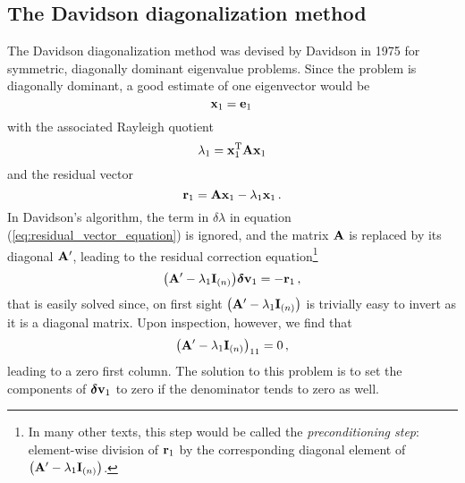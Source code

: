    \subsection{The Davidson diagonalization method}
        The Davidson diagonalization method was devised by Davidson in 1975 \cite{davidson1975} for symmetric, diagonally dominant eigenvalue problems. Since the problem is diagonally dominant, a good estimate of one eigenvector would be
        \begin{equation}
            \vb{x}_1 = \vb{e}_1 \thinspace
        \end{equation}
        with the associated Rayleigh quotient
        \begin{equation}
            \lambda_1 = \vb{x}_1^\text{T} \vb{A} \vb{x}_1
        \end{equation}
        and the residual vector
        \begin{equation}
            \vb{r}_1 = \vb{A} \vb{x}_1 - \lambda_1 \vb{x}_1 \thinspace .
        \end{equation}
        In Davidson's algorithm, the term in $\delta\lambda$ in equation (\ref{eq:residual_vector_equation}) is ignored, and the matrix $\vb{A}$ is replaced by its diagonal $\vb{A}'$, leading to the residual correction equation\footnote{In many other texts, this step would be called the \emph{preconditioning step}: element-wise division of $\vb{r}_1$ by the corresponding diagonal element of $\qty(\vb{A}' - \lambda_1 \vb{I}_{(n)})$.}
        \begin{equation}
            \qty(\vb{A}' - \lambda_1 \vb{I}_{(n)}) \boldsymbol{\delta} \vb{v}_1 = - \vb{r}_1 \thinspace ,
        \end{equation}
        that is easily solved since, on first sight $\qty(\vb{A}' - \lambda_1 \vb{I}_{(n)})$ is trivially easy to invert as it is a diagonal matrix. Upon inspection, however, we find that
        \begin{equation}
            \qty(\vb{A}' - \lambda_1 \vb{I}_{(n)})_{11} = 0 \thinspace ,
        \end{equation}
        leading to a zero first column. The solution to this problem is to set the components of $\boldsymbol{\delta} \vb{v}_1$ to zero if the denominator tends to zero as well.\\

